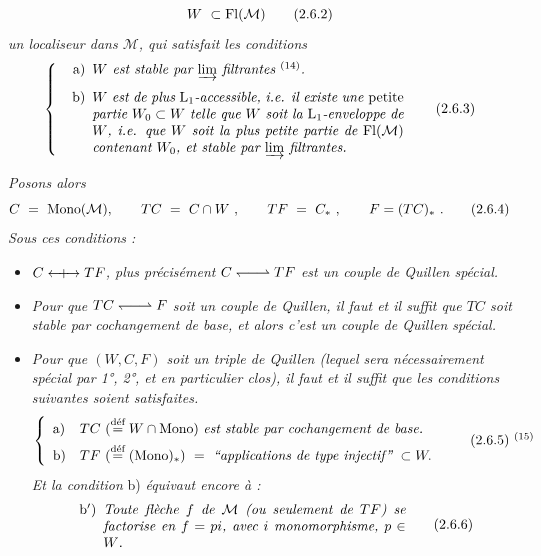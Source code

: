 \[ W \ \subset \Fl(\mathcal{M}) \tag*{(2.6.2)} \]
\textit{un localiseur dans $\mathcal{M}$, qui satisfait les conditions}
\[ \left\{ \begin{minipage}{0.72\textwidth}\itshape
\begin{itemize}[leftmargin=2.5em]
\item[\upshape a)] $W$ est stable par $\varinjlim$ filtrantes $^{\textup{(14)}}$.
\item[\upshape b)] $W$ est de plus $\mathrm{L}_1$-accessible, i.e. il existe une \textup{petite} partie $W_0 \subset W$ telle que $W$ soit la $\mathrm{L}_1$-enveloppe de $W$, i.e. que $W$ soit la plus petite partie de $\Fl(\mathcal{M})$ contenant $W_0$, et stable par $\varinjlim$ filtrantes. %
\end{itemize}
\end{minipage}\right. \tag*{(2.6.3)} \]


\textit{Posons alors}
\[ C \ = \ \Mono(\mathcal{M}), \qquad TC \ = \ C\cap W\ , \qquad TF \ = \ C_*\ , \qquad F = (TC)_*\ . \tag*{(2.6.4)} \]
\textit{Sous ces conditions :}
\begin{itemize}[leftmargin=2.5em]
\item[1°)] \textit{$C \mathrel{\leftarrow\mkern-9mu{+}\mkern-9mu\rightarrow} TF$, plus précisément $C \qpair TF$ est un couple de Quillen spécial.} %
\item[2°)] \textit{Pour que $TC \qpair F$ soit un couple de Quillen, il faut et il suffit que $TC$ soit stable par cochangement de base, et alors c'est un couple de Quillen spécial.} %
\item[3°)] \textit{Pour que $(W,C,F)$ soit un triple de Quillen (lequel sera nécessairement spécial par \textup{1°, 2°}, et en particulier clos), il faut et il suffit que les conditions suivantes soient satisfaites.}
\[ \left\{ \begin{array}{ll}
\text{a)} & TC\ (\deq W\cap\Mono)\ \text{\itshape est stable par cochangement de base.}\\[1ex]
\text{b)} & TF\ (\deq (\Mono)_*) \ = \ \text{\itshape “applications de type injectif”}\ \subset W.
\end{array}\right. \tag*{(2.6.5)~$^{(15)}$} \]
\textit{Et la condition} b) \textit{équivaut encore à :}
\[ \begin{minipage}{0.7\textwidth}
\begin{itemize}[leftmargin=2.5em]
\item[b$'$)] \textit{Toute flèche $f$ de $\mathcal{M}$ (ou seulement de $TF$) se factorise en $f = pi$, avec $i$ monomorphisme, $p \in W$.}
\end{itemize}
\end{minipage} \tag*{(2.6.6)} \]
\end{itemize}

